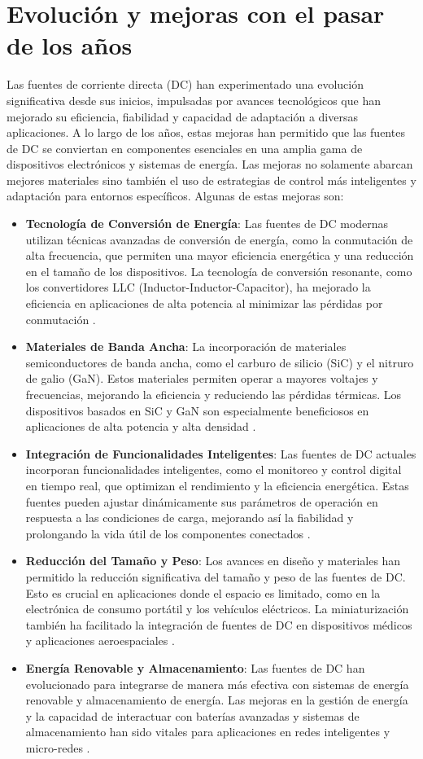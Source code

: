 \section{Evolución y mejoras con el pasar de los años}
Las fuentes de corriente directa (DC) han experimentado una evolución significativa desde sus inicios, impulsadas por avances tecnológicos que han mejorado su eficiencia, fiabilidad y capacidad de adaptación a diversas aplicaciones. A lo largo de los años, estas mejoras han permitido que las fuentes de DC se conviertan en componentes esenciales en una amplia gama de dispositivos electrónicos y sistemas de energía. Las mejoras no solamente abarcan mejores materiales sino también el uso de estrategias de control más inteligentes y adaptación para entornos específicos.
Algunas de estas mejoras son:
\begin{itemize}
    \item \textbf{Tecnología de Conversión de Energía}: Las fuentes de DC modernas utilizan técnicas avanzadas de conversión de energía, como la conmutación de alta frecuencia, que permiten una mayor eficiencia energética y una reducción en el tamaño de los dispositivos. La tecnología de conversión resonante, como los convertidores LLC (Inductor-Inductor-Capacitor), ha mejorado la eficiencia en aplicaciones de alta potencia al minimizar las pérdidas por conmutación \cite{zhang2013}.
    \item \textbf{Materiales de Banda Ancha}: La incorporación de materiales semiconductores de banda ancha, como el carburo de silicio (SiC) y el nitruro de galio (GaN). Estos materiales permiten operar a mayores voltajes y frecuencias, mejorando la eficiencia y reduciendo las pérdidas térmicas. Los dispositivos basados en SiC y GaN son especialmente beneficiosos en aplicaciones de alta potencia y alta densidad \cite{palmour2019}.
    \item \textbf{Integración de Funcionalidades Inteligentes}: Las fuentes de DC actuales incorporan funcionalidades inteligentes, como el monitoreo y control digital en tiempo real, que optimizan el rendimiento y la eficiencia energética. Estas fuentes pueden ajustar dinámicamente sus parámetros de operación en respuesta a las condiciones de carga, mejorando así la fiabilidad y prolongando la vida útil de los componentes conectados \cite{brown2020}.
    \item \textbf{Reducción del Tamaño y Peso}: Los avances en diseño y materiales han permitido la reducción significativa del tamaño y peso de las fuentes de DC. Esto es crucial en aplicaciones donde el espacio es limitado, como en la electrónica de consumo portátil y los vehículos eléctricos. La miniaturización también ha facilitado la integración de fuentes de DC en dispositivos médicos y aplicaciones aeroespaciales \cite{kumar2017}.
    \item \textbf{Energía Renovable y Almacenamiento}: Las fuentes de DC han evolucionado para integrarse de manera más efectiva con sistemas de energía renovable y almacenamiento de energía. Las mejoras en la gestión de energía y la capacidad de interactuar con baterías avanzadas y sistemas de almacenamiento han sido vitales para aplicaciones en redes inteligentes y micro-redes \cite{hoffmann2021}.
\end{itemize}
